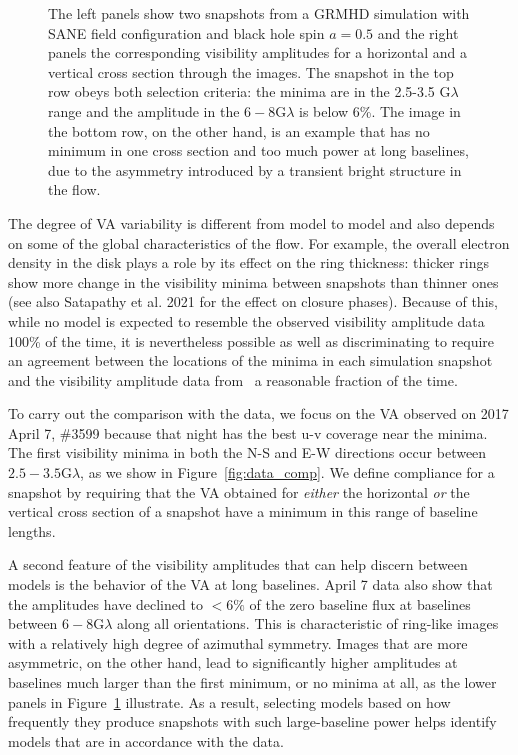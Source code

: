 \documentclass[twocolumn,tighten,dvipsnames,linenumbers]{aastex63}
\begin{document}
\begin{figure}
\caption{\footnotesize The left panels show two snapshots from a
    GRMHD simulation with SANE field configuration and black hole spin $a=0.5$
    and the right panels the corresponding
    visibility amplitudes for a horizontal and a vertical cross
    section through the images. The snapshot in the top row obeys both
    selection criteria: the minima are in the 2.5-3.5 G$\lambda$ range
    and the amplitude in the $6-8$G$\lambda$ is below 6\%. The image in
    the bottom row, on the other hand, is an example that has no minimum
    in one cross section and too much power at long baselines, due to
    the asymmetry introduced by a transient bright structure in the flow. }
    \label{fig:VA}
    \end{figure}

The degree of VA variability is different from model to model and also
depends on some of the global characteristics of the flow. For
example, the overall electron density in the disk plays a role by its
effect on the ring thickness: thicker rings show more change in the
visibility minima between snapshots than thinner ones (see also
Satapathy et al. 2021 for the effect on closure phases). Because of
this, while no model is expected to resemble the observed visibility
amplitude data 100\% of the time, it is nevertheless possible as well
as discriminating to require an agreement between the locations of the
minima in each simulation snapshot and the visibility amplitude data
from \sgra\ a reasonable fraction of the time.


To carry out the comparison with the data, we focus on the VA observed
on 2017 April 7, \#3599 because that night has the best u-v coverage
near the minima. The first visibility minima in both the N-S and E-W
directions occur between $2.5-3.5$\;G$\lambda$, as we show in
Figure~\ref{fig:data_comp}. We define compliance for a snapshot by
requiring that the VA obtained for {\it either} the horizontal {\it
or} the vertical cross section of a snapshot have a minimum in this
range of baseline lengths.

A second feature of the visibility amplitudes that can help discern
between models is the behavior of the VA at long baselines. April 7
data also show that the amplitudes have declined to $<6\%$ of the zero
baseline flux at baselines between $6-8$\;G$\lambda$ along all
orientations. This is characteristic of ring-like images with a
relatively high degree of azimuthal symmetry. Images that are more
asymmetric, on the other hand, lead to significantly higher amplitudes
at baselines much larger than the first minimum, or no minima at all,
as the lower panels in Figure~\ref{fig:VA} illustrate. As a result,
selecting models based on how frequently they produce snapshots with
such large-baseline power helps identify models that are in accordance
with the data.
\end{document}
